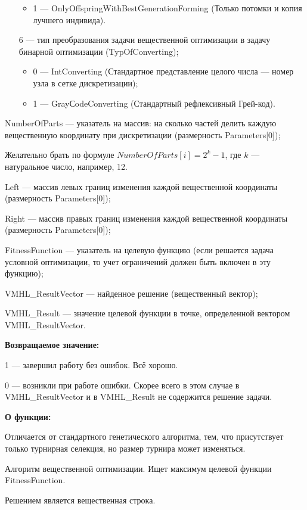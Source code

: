 \documentclass[a4paper,12pt]{article}
\begin{document}
\begin{itemize}
\begin{itemize}
       \item 1 --- OnlyOffspringWithBestGenerationForming (Только потомки и копия лучшего индивида).
	    \end{itemize}
 \item [6] --- тип преобразования задачи вещественной оптимизации в задачу бинарной оптимизации (TypOfConverting);
   \begin{itemize}
        \item 0 --- IntConverting (Стандартное представление целого числа –-- номер узла в сетке дискретизации);
        \item 1 --- GrayСodeConverting (Стандартный рефлексивный Грей-код).
			    \end{itemize}
 \end{itemize}
 
 NumberOfParts --- указатель на массив: на сколько частей делить каждую вещественную координату при дискретизации (размерность Parameters[0]);
 
  Желательно брать по формуле $NumberOfParts[i]=2^k-1$, где $k$ --- натуральное число, например, 12.
  
 Left --- массив левых границ изменения каждой вещественной координаты (размерность Parameters[0]);
 
 Right --- массив правых границ изменения каждой вещественной координаты (размерность Parameters[0]);
 
 FitnessFunction --- указатель на целевую функцию (если решается задача условной оптимизации, то учет ограничений должен быть включен в эту функцию);
 
 VMHL\_ResultVector --- найденное решение (вещественный вектор);
 
 VMHL\_Result --- значение целевой функции в точке, определенной вектором VMHL\_ResultVector.

\textbf{Возвращаемое значение:} 

 1 --- завершил работу без ошибок. Всё хорошо.
 
 0 --- возникли при работе ошибки. Скорее всего в этом случае в VMHL\_ResultVector и в VMHL\_Result не содержится решение задачи.

\textbf{О функции:}

Отличается от стандартного генетического алгоритма, тем, что присутствует только турнирная селекция, но размер турнира может изменяться.

Алгоритм вещественной оптимизации. Ищет максимум целевой функции FitnessFunction.

Решением является вещественная строка.
\end{document}

